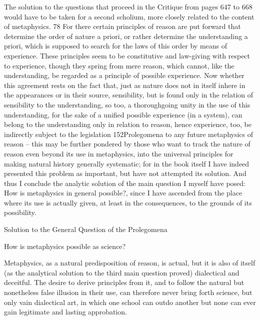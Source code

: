 The solution to the questions that proceed in the Critique from pages
647 to 668 would have to be taken for a second scholium, more closely
related to the content of metaphysics. 78 For there certain principles of
reason are put forward that determine the order of nature a priori, or
rather determine the understanding a priori, which is supposed to search
for the laws of this order by means of experience. These principles seem
to be constitutive and law-giving with respect to experience, though
they spring from mere reason, which cannot, like the understanding,
be regarded as a principle of possible experience. Now whether this
agreement rests on the fact that, just as nature does not in itself inhere
in the appearances or in their source, sensibility, but is found only in
the relation of sensibility to the understanding, so too, a thoroughgoing
unity in the use of this understanding, for the sake of a uniﬁed possible
experience (in a system), can belong to the understanding only in relation
to reason, hence experience, too, be indirectly subject to the legislation
152Prolegomena to any future metaphysics
of reason – this may be further pondered by those who want to track the
nature of reason even beyond its use in metaphysics, into the universal
principles for making natural history generally systematic; for in the
book itself I have indeed presented this problem as important, but have
not attempted its solution.
And thus I conclude the analytic solution of the main question I
myself have posed: How is metaphysics in general possible?, since I have
ascended from the place where its use is actually given, at least in the
consequences, to the grounds of its possibility.

Solution to the General Question of the Prolegomena

How is metaphysics possible as science?

Metaphysics, as a natural predisposition of reason, is actual, but it is also
of itself (as the analytical solution to the third main question proved)
dialectical and deceitful. The desire to derive principles from it, and to
follow the natural but nonetheless false illusion in their use, can therefore
never bring forth science, but only vain dialectical art, in which one
school can outdo another but none can ever gain legitimate and lasting
approbation.

